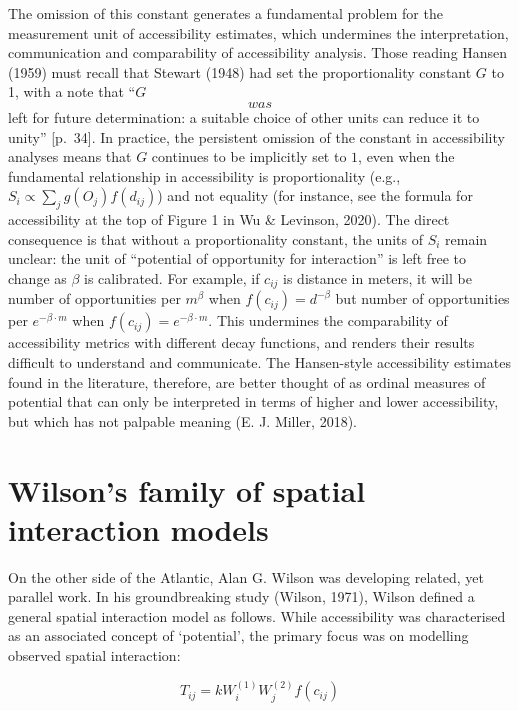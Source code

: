 \documentclass[
11pt, %
oneside, %
english, %
singlespacing, %
]{macthesis} %
\begin{document}
The omission of this constant generates a fundamental problem for the measurement unit of accessibility estimates, which undermines the interpretation, communication and comparability of accessibility analysis. Those reading Hansen (1959) must recall that Stewart (1948) had set the proportionality constant \(G\) to 1, with a note that ``\(G\) \[was\] left for future determination: a suitable choice of other units can reduce it to unity'' {[}p.~34{]}. In practice, the persistent omission of the constant in accessibility analyses means that \(G\) continues to be implicitly set to \(1\), even when the fundamental relationship in accessibility is proportionality (e.g., \(S_{i} \propto \sum_j g(O_j)f(d_{ij})\)) and not equality (for instance, see the formula for accessibility at the top of Figure 1 in Wu \& Levinson, 2020). The direct consequence is that without a proportionality constant, the units of \(S_i\) remain unclear: the unit of ``potential of opportunity for interaction'' is left free to change as \(\beta\) is calibrated. For example, if \(c_{ij}\) is distance in meters, it will be number of opportunities per \(m^{\beta}\) when \(f(c_{ij}) = d^{-\beta}\) but number of opportunities per \(e^{-\beta\cdot m}\) when \(f(c_{ij}) = e^{-\beta\cdot m}\). This undermines the comparability of accessibility metrics with different decay functions, and renders their results difficult to understand and communicate. The Hansen-style accessibility estimates found in the literature, therefore, are better thought of as ordinal measures of potential that can only be interpreted in terms of higher and lower accessibility, but which has not palpable meaning (E. J. Miller, 2018).

\section{Wilson's family of spatial interaction models}\label{wilsons-family-of-spatial-interaction-models}

On the other side of the Atlantic, Alan G. Wilson was developing related, yet parallel work. In his groundbreaking study (Wilson, 1971), Wilson defined a general spatial interaction model as follows. While accessibility was characterised as an associated concept of `potential', the primary focus was on modelling observed spatial interaction:

\begin{equation}
\label{eq:phys-gravity-model}
T_{ij} = k W_i^{(1)} W_j^{(2)} f(c_{ij})
\end{equation} 
\end{document}
